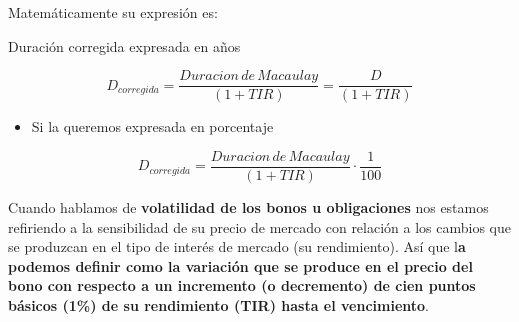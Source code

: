 \documentclass[
  letterpaper,
  DIV=11,
  numbers=noendperiod]{scrartcl}
\providecommand{\tightlist}{%
  \setlength{\itemsep}{0pt}\setlength{\parskip}{0pt}}\usepackage{longtable,booktabs,array}
\begin{document}
Matemáticamente su expresión es:

\begin{tcolorbox}[enhanced jigsaw, colframe=quarto-callout-note-color-frame, opacityback=0, colback=white, leftrule=.75mm, left=2mm, breakable, arc=.35mm, rightrule=.15mm, toprule=.15mm, bottomrule=.15mm]
\begin{minipage}[t]{5.5mm}
\textcolor{quarto-callout-note-color}{\faInfo}
\end{minipage}%
\begin{minipage}[t]{\textwidth - 5.5mm}

Duración corregida expresada en años

\[D_{corregida}=\frac{Duracion\,de\, Macaulay}{\left(1+TIR\right)}=\frac{D}{\left(1+TIR\right)} \]

\begin{itemize}
\tightlist
\item
  Si la queremos expresada en porcentaje
\end{itemize}

\[D_{corregida}=\frac{Duracion\,de\, Macaulay}{\left(1+TIR\right)}\cdot\frac{1}{100}\]

\end{minipage}%
\end{tcolorbox}

Cuando hablamos de \textbf{volatilidad de los bonos u obligaciones} nos
estamos refiriendo a la sensibilidad de su precio de mercado con
relación a los cambios que se produzcan en el tipo de interés de mercado
(su rendimiento). Así que l\textbf{a podemos definir como la variación
que se produce en el precio del bono con respecto a un incremento (o
decremento) de cien puntos básicos (1\%) de su rendimiento (TIR) hasta
el vencimiento}.
\end{document}
